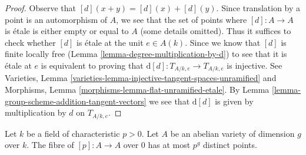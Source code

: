\begin{proof}
Observe that $[d](x + y) = [d](x) + [d](y)$. Since translation by a
point is an automorphism of $A$, we see that the set of points where
$[d] : A \to A$ is \'etale is either empty or equal to $A$ (some details
omitted). Thus it suffices to check whether $[d]$ is \'etale at
the unit $e \in A(k)$. Since we know that $[d]$ is finite locally free
(Lemma \ref{lemma-degree-multiplication-by-d})
to see that it is \'etale at $e$ is equivalent to
proving that $\text{d}[d] : T_{A/k, e} \to T_{A/k, e}$ is injective. See
Varieties, Lemma \ref{varieties-lemma-injective-tangent-spaces-unramified} and
Morphisms, Lemma \ref{morphisms-lemma-flat-unramified-etale}.
By Lemma \ref{lemma-group-scheme-addition-tangent-vectors} we see that
$\text{d}[d]$ is given by multiplication by $d$ on $T_{A/k, e}$.
\end{proof}

\begin{lemma}
\label{lemma-abelian-variety-multiplication-by-p}
Let $k$ be a field of characteristic $p > 0$. Let $A$ be an abelian variety
of dimension $g$
over $k$. The fibre of $[p] : A \to A$ over $0$ has at most
$p^g$ distinct points.
\end{lemma}

